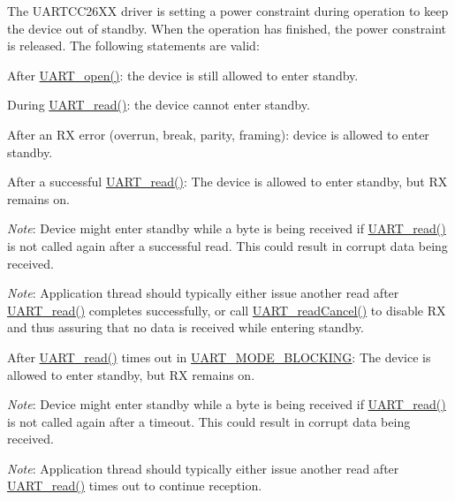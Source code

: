 The U\+A\+R\+T\+C\+C26\+X\+X driver is setting a power constraint during operation to keep the device out of standby. When the operation has finished, the power constraint is released. The following statements are valid\+:
\begin{DoxyItemize}
\item After \hyperlink{_u_a_r_t_8h_a0442ea1ec23901168da31726bb3254c1}{U\+A\+R\+T\+\_\+open()}\+: the device is still allowed to enter standby.
\item During \hyperlink{_u_a_r_t_8h_a023152d57539cad94bdd813956013e73}{U\+A\+R\+T\+\_\+read()}\+: the device cannot enter standby.
\item After an R\+X error (overrun, break, parity, framing)\+: device is allowed to enter standby.
\item After a successful \hyperlink{_u_a_r_t_8h_a023152d57539cad94bdd813956013e73}{U\+A\+R\+T\+\_\+read()}\+: The device is allowed to enter standby, but R\+X remains on.
\begin{DoxyItemize}
\item {\itshape Note}\+: Device might enter standby while a byte is being received if \hyperlink{_u_a_r_t_8h_a023152d57539cad94bdd813956013e73}{U\+A\+R\+T\+\_\+read()} is not called again after a successful read. This could result in corrupt data being received.
\item {\itshape Note}\+: Application thread should typically either issue another read after \hyperlink{_u_a_r_t_8h_a023152d57539cad94bdd813956013e73}{U\+A\+R\+T\+\_\+read()} completes successfully, or call \hyperlink{_u_a_r_t_8h_a51ed7e94d5b409ca1fcb2d65c5a25c3c}{U\+A\+R\+T\+\_\+read\+Cancel()} to disable R\+X and thus assuring that no data is received while entering standby.
\end{DoxyItemize}
\item After \hyperlink{_u_a_r_t_8h_a023152d57539cad94bdd813956013e73}{U\+A\+R\+T\+\_\+read()} times out in \hyperlink{_u_a_r_t_8h_a2507a620dba95cd20885c52494d19e90ae6b6bd5d2d5df859ad6724e89e605ebf}{U\+A\+R\+T\+\_\+\+M\+O\+D\+E\+\_\+\+B\+L\+O\+C\+K\+I\+N\+G}\+: The device is allowed to enter standby, but R\+X remains on.
\begin{DoxyItemize}
\item {\itshape Note}\+: Device might enter standby while a byte is being received if \hyperlink{_u_a_r_t_8h_a023152d57539cad94bdd813956013e73}{U\+A\+R\+T\+\_\+read()} is not called again after a timeout. This could result in corrupt data being received.
\item {\itshape Note}\+: Application thread should typically either issue another read after \hyperlink{_u_a_r_t_8h_a023152d57539cad94bdd813956013e73}{U\+A\+R\+T\+\_\+read()} times out to continue reception.

\end{DoxyItemize}
\end{DoxyItemize}

